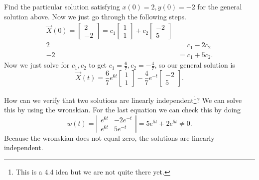 \begin{eg}
  Find the particular solution satisfying $x(0)=2,y(0)=-2$ for the general solution above. Now we just go through the following steps.
  \begin{align*}
    \vec{X}(0)=\begin{bmatrix} 2\\-2 \end{bmatrix} =c_1\begin{bmatrix} 1\\1 \end{bmatrix} +c_2\begin{bmatrix} -2\\5 \end{bmatrix} \\
    2&=c_1-2c_2\\
    -2&=c_1+5c_2
  .\end{align*}
  Now we just solve for $c_1,c_2$ to get $c_1=\frac{6}{7},c_2=-\frac{4}{7}$, so our general solution is \[
    \vec{X}(t)=\frac{6}{7}e^{6t}\begin{bmatrix} 1\\1 \end{bmatrix} -\frac{4}{7}e^{-t}\begin{bmatrix} -2\\5 \end{bmatrix} 
  .\] 
\end{eg}

How can we verify that two solutions are linearly independent\footnote{This is a 4.4 idea but we are not quite there yet.}? We can solve this by using the wronskian. For the last equation we can check this by doing \[
  w(t)=\left| \begin{matrix} e^{6t}&-2e^{-t}\\e^{6t}&5e^{-t} \end{matrix} \right| = 5e^{5t}+2e^{5t}\neq 0 
.\] Because the wronskian does not equal zero, the solutions are linearly independent.\newline 

